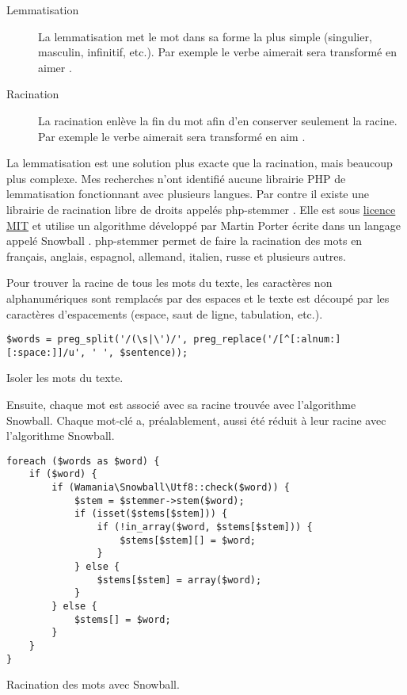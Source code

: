 \begin{description}
  \item[Lemmatisation]
  
  La lemmatisation met le mot dans sa forme la plus simple (singulier, masculin, infinitif, etc.).
  Par exemple le verbe \og aimerait \fg{} sera transformé en \og aimer \fg{}.
  
  \item[Racination]
  
  La racination enlève la fin du mot afin d'en conserver seulement la racine.
  Par exemple le verbe \og aimerait \fg{} sera transformé en \og aim \fg{}.
\end{description}

La lemmatisation est une solution plus exacte que la racination, mais beaucoup plus complexe.
Mes recherches n'ont identifié aucune librairie PHP de lemmatisation fonctionnant avec plusieurs langues.
Par contre il existe une librairie de racination libre de droits appelés php-stemmer \cite{phpstemmer}.
Elle est sous \href{https://raw.githubusercontent.com/wamania/php-stemmer/master/LICENSE}{licence MIT} et utilise un algorithme développé par Martin Porter écrite dans un langage appelé Snowball \cite{snowball}.
php-stemmer permet de faire la racination des mots en français, anglais, espagnol, allemand, italien, russe et plusieurs autres.

Pour trouver la racine de tous les mots du texte, les caractères non alphanumériques sont remplacés par des espaces et le texte est découpé par les caractères d'espacements (espace, saut de ligne, tabulation, etc.).

\begin{lstfloat}
\begin{lstlisting}[frame=l]
$words = preg_split('/(\s|\')/', preg_replace('/[^[:alnum:][:space:]]/u', ' ', $sentence));
\end{lstlisting}
\caption{Isoler les mots du texte.}
\label{code:commentaire}
\end{lstfloat}

Ensuite, chaque mot est associé avec sa racine trouvée avec l'algorithme Snowball.
Chaque mot-clé a, préalablement, aussi été réduit à leur racine avec l'algorithme Snowball.

\begin{lstfloat}
\begin{lstlisting}[frame=l]
foreach ($words as $word) {
	if ($word) {
		if (Wamania\Snowball\Utf8::check($word)) {
			$stem = $stemmer->stem($word);
			if (isset($stems[$stem])) {
				if (!in_array($word, $stems[$stem])) {
					$stems[$stem][] = $word;
				}
			} else {
				$stems[$stem] = array($word);
			}
		} else {
			$stems[] = $word;
		}
	}
}
\end{lstlisting}
\caption{Racination des mots avec Snowball.}
\label{code:racinationsnowball}
\end{lstfloat}

